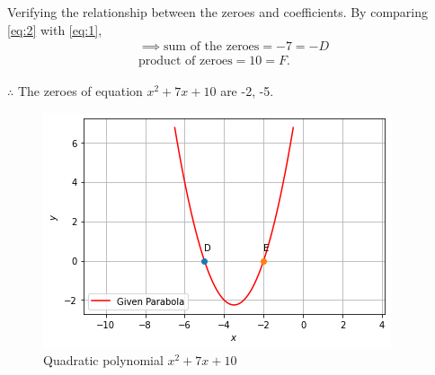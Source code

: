 \documentclass[journal,12pt,twocolumn]{IEEEtran}
\begin{document}
Verifying the relationship between the zeroes and coefficients. By comparing \eqref{eq:2} with \eqref{eq:1},
\begin{align}
    \implies \text{sum of the zeroes} = -7 = -D\\
    \text{product of zeroes} = 10 = F.
\end{align}

$\therefore$ The zeroes of equation $x^2+7x+10$ are -2, -5.


\begin{figure}[htp]
    \centering
    \includegraphics[width=\columnwidth]{a_5_final.png}
    \caption{Quadratic polynomial $x^2+7x+10$}
    \label{fig:my_label}
\end{figure}
\end{document}
